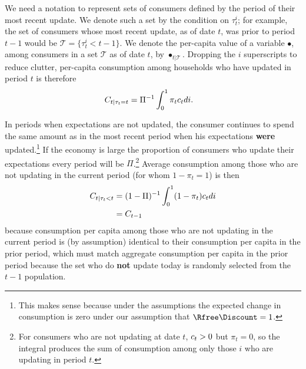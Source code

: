 \documentclass{handout}
\begin{document}
We need a notation to represent sets of consumers defined by the period of their most recent
update.  We denote such a set by the condition
on $\tau^{i}_{t}$; for example, the set of consumers whose most recent update, as of
date $t$, was prior to period $t-1$ would be $\mathcal{T} = \{\tau^{i}_{t} < t-1\}$.  
We denote the per-capita value of a variable $\bullet$, among consumers in a set $\mathcal{T}$
as of date $t$, by $\bullet_{t|\mathcal{T}}$.  Dropping the $i$ superscripts to reduce clutter, per-capita consumption among households who have updated in period $t$ is therefore
\begin{equation}\begin{gathered}\begin{aligned}
        C_{t|\tau_{t}=t} & =  \Pi^{-1} \int_{0}^{1} \pi_{t} c_{t} di
.
\end{aligned}\end{gathered}\end{equation}

In periods when expectations are not updated, the
consumer continues to spend the same amount as in the most
recent period when his expectations {\bf were} updated.\footnote{This makes sense because under the \cite{hallRandomWalk} assumptions the expected change in consumption is zero under our assumption that $\Rfree \Discount=1$.}  If the economy is large the proportion of consumers who update their 
expectations every period will be $\Pi$.\footnote{For consumers who are not updating at date $t$, $c_{t} > 0$ but $\pi_{t} = 0$, so the integral produces the sum of consumption among only those $i$ who are updating in period $t$.}  Average consumption among those who are not updating in the current 
period (for whom $1-\pi_{t}=1$) is then 
\begin{equation}\begin{gathered}\begin{aligned}
  C_{t|\tau_{t} < t} & =  (1-\Pi)^{-1} \int_{0}^{1} (1-\pi_{t}) c_{t} di
\\ & =  C_{t-1}
\end{aligned}\end{gathered}\end{equation}
because consumption per capita among those who are not updating in the
current period is (by assumption) identical to their consumption per
capita in the prior period, which must match aggregate consumption per
capita in the prior period because the set who do {\bf not} update
today is randomly selected from the $t-1$ population.
\end{document}
